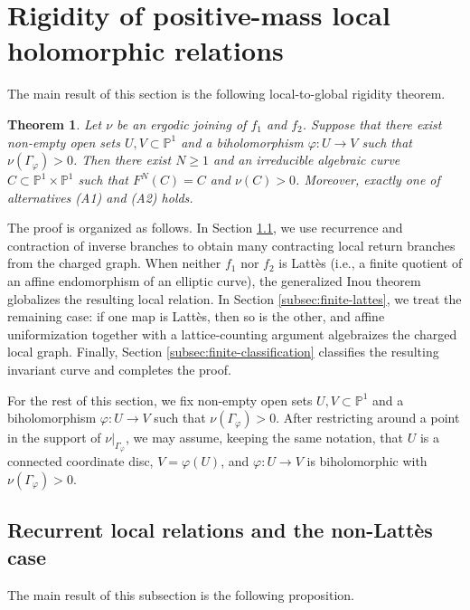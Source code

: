 \documentclass[11pt]{amsart}
\numberwithin{equation}{section}
\theoremstyle{plain}
\newtheorem{thm}{Theorem}[section]
\theoremstyle{definition}
\theoremstyle{remark}
\begin{document}
\section{Rigidity of positive-mass local holomorphic relations}
\label{sec:finite-algebraization}
The main result of this section is the following local-to-global
rigidity theorem.

\begin{thm}\label{thm:Cnu-finite}
Let $\nu$ be an ergodic joining of $f_1$ and $f_2$. Suppose that
there exist non-empty open sets $U,V\subset\mathbb P^1$ and a
biholomorphism $\varphi\colon U\to V$ such that
$\nu(\Gamma_\varphi)>0$. Then there exist $N\geq1$ and an
irreducible algebraic curve
$C\subset\mathbb P^1\times\mathbb P^1$ such that $F^N(C)=C$ and
$\nu(C)>0$. Moreover, exactly one of alternatives \textup{(A1)} and \textup{(A2)}
holds.
\end{thm}

The proof is organized as follows. In Section
\ref{subsec:finite-recurrent-returns}, we use recurrence and
contraction of inverse branches to obtain many contracting local
return branches from the charged graph. When neither $f_1$ nor
$f_2$ is Latt\`es (i.e.,
a finite quotient of an affine
endomorphism of an elliptic curve), the generalized Inou theorem
\cite[Theorem 2.1]{JiXieLocalRigidityJuliaSets} globalizes the
resulting local relation. In Section \ref{subsec:finite-lattes}, we
treat the remaining case: if one map is Latt\`es, then so is the
other, and affine uniformization together with a lattice-counting
argument algebraizes the charged local graph. Finally, Section
\ref{subsec:finite-classification} classifies the resulting
invariant curve and completes the proof.

For the rest of this section, we fix non-empty open sets
$U,V\subset\mathbb P^1$ and a biholomorphism
$\varphi\colon U\to V$ such that $\nu(\Gamma_\varphi)>0$. After restricting around a point in the support of
$\nu|_{\Gamma_\varphi}$, we may assume, keeping the same notation,
that $U$ is a connected coordinate disc, $V=\varphi(U)$, and
$\varphi\colon U\to V$ is biholomorphic with
$\nu(\Gamma_\varphi)>0$.


\subsection{Recurrent local relations and the non-Latt\`es case}
\label{subsec:finite-recurrent-returns}
The main result of this subsection is the following proposition.
\end{document}
